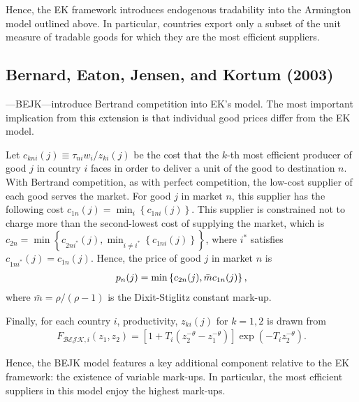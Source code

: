 \documentclass[12pt,dvips, ps2pdf]{article}
\begin{document}
Hence, the EK framework introduces endogenous tradability into the Armington model outlined above. In particular, countries export only a subset of the unit measure of tradable goods for which they are the most efficient suppliers.

\subsection{Bernard, Eaton, Jensen, and Kortum (2003)}

\citet{bejk03}---BEJK---introduce Bertrand competition into EK's model. The most important implication from this extension is that individual good prices differ from the EK model.

Let $c_{kni}(j)\equiv \tau_{ni}w_i/z_{ki}(j)$ be the cost that the $k$-th most efficient producer of good $j$ in country $i$ faces in order to deliver a unit of the good to destination $n$. With Bertrand competition, as with perfect competition, the low-cost supplier of each good serves the market. For good $j$ in market $n$, this supplier has the following cost $c_{1n}(j)=\min_i\left\{c_{1ni}(j)\right\}$. This supplier is constrained not to charge more than the second-lowest cost of supplying the market, which is $c_{2n}=\min\left\{c_{2ni^*}(j),\min_{i\neq i^*}\left\{c_{1ni}(j)\right\}\right\}$, where $i^*$ satisfies $c_{1ni^*}(j)=c_{1n}(j)$. Hence, the price of good $j$ in market $n$ is
\begin{align}
p_n(j)=\min\left\{c_{2n}(j),\bar mc_{1n}(j)\right\}\notag,
\end{align}
where $\bar m={\rho}/({\rho-1})$ is the Dixit-Stiglitz constant mark-up.

Finally, for each country $i$, productivity, $z_{ki}(j)$ for $k = 1, 2$ is drawn from
\begin{eqnarray*}
F_{\mathcal{BEJK},i}(z_1,z_2) = \left[1+T_i( z_{2}^{-\theta}-z_{1}^{-\theta})\right]\exp\left(-T_i z_{2}^{-\theta}\right).
\end{eqnarray*}

Hence, the BEJK model features a key additional component relative to the EK framework: the existence of variable mark-ups. In particular, the most efficient suppliers in this model enjoy the highest mark-ups.
\end{document}
